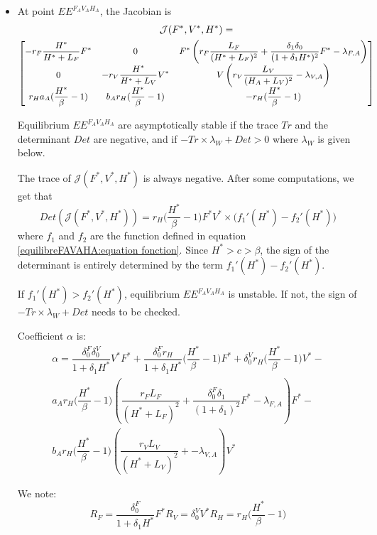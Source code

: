 \documentclass{article}
\newcommand{\lfa}{\lambda_{F, A}}
\newcommand{\lva}{\lambda_{V, A}}
\newcommand{\lfv}{\lambda_{W}}
\newcommand{\df}{\delta_0^F}
\newcommand{\dv}{\delta_0^V}
\begin{document}
\begin{itemize}
\item At point $EE^{F_AV_AH_A}$, the Jacobian is
\begin{multline}
\mathcal{J}(F^*,V^*,H^*) = \\
{\small
\begin{bmatrix}
-r_F \dfrac{H^*}{H^* + L_F}F^* & 0 & F^*\left(r_F \dfrac{L_F}{(H^* + L_F)^2} + \dfrac{\delta_1 \delta_0}{(1 + \delta_1 H^*)^2}F^* - \lfa \right)\\
0 & -r_V \dfrac{H^*}{H^* + L_V}V^* &V\left(r_V \dfrac{L_V}{(H_A+L_V)^2} - \lva \right) \\
r_H a_A (\dfrac{H^*}{\beta}-1) & b_A r_H (\dfrac{H^*}{\beta}-1) & -r_H (\dfrac{H^*}{\beta}-1)
\end{bmatrix}}
\label{equilibreFAVAHA:jacobian}
\end{multline}

Equilibrium $EE^{F_AV_AH_A}$ are asymptotically stable if the trace $Tr$ and the determinant $Det$ are negative, and if $-Tr \times \lfv + Det > 0$ where $\lfv$ is given below.

The trace of $\mathcal{J}(F^*,V^*,H^*)$ is always negative. After some computations, we get that
$$
Det(\mathcal{J}(F^*,V^*,H^*)) = r_H \Big(\dfrac{H^*}{\beta}-1\Big) F^* V^* \times \Big(f_1'(H^*) - f_2'(H^*) \Big)
$$
where $f_1$ and $f_2$ are the function defined in equation \eqref{equilibreFAVAHA:equation fonction}. Since $H^* > c > \beta$, the sign of the determinant is entirely determined by the term $f_1'(H^*) - f_2'(H^*)$.

If $f_1'(H^*) > f_2'(H^*)$, equilibrium $EE^{F_AV_AH_A}$ is unstable. If not, the sign of $-Tr \times \lfv + Det$ needs to be checked.

Coefficient $\alpha$ is:
\begin{multline*}
\alpha = \dfrac{\df \dv }{1 + \delta_1 H^*}V^*F^* + \dfrac{\df r_H}{1 + \delta_1 H^*}\Big(\dfrac{H^*}{\beta}-1\Big)F^* + \dv r_H \Big(\dfrac{H^*}{\beta}-1\Big)V^* - \\
a_A r_H \Big(\dfrac{H^*}{\beta}-1\Big) \left(\dfrac{r_FL_F}{(H^* + L_F)^2} + \dfrac{\df \delta_1}{(1+\delta_1)^2}F^* -\lfa\right)F^* -\\
b_A r_H \Big(\dfrac{H^*}{\beta}-1\Big) \left(\dfrac{r_VL_V}{(H^* + L_V)^2} + -\lva\right)V^*
\end{multline*}

We note:
\begin{subequations}
\begin{equation}
R_F = \dfrac{\df}{1 + \delta_1 H^*} F^*
\end{equation}
\begin{equation}
R_V = \dv V^*
\end{equation}
\begin{equation}
R_H = r_H\Big(\dfrac{H^*}{\beta} - 1\Big)
\end{equation}
\end{subequations}



\end{itemize}
\end{document}
